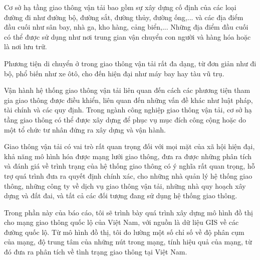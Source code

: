 \documentclass[14pt, oneside, a4paper, openany]{scrartcl}
\begin{document}
Cơ sở hạ tầng giao thông vận tải bao gồm sự xây dựng cố định của các loại đường đi như đường bộ, đường sắt, đường thủy, đường ống,... và các địa điểm đầu cuối như sân bay, nhà ga, kho hàng, cảng biển,... Những địa điểm đầu cuối có thể được sử dụng như nơi trung gian vận chuyển con người và hàng hóa hoặc là nơi lưu trữ.

Phương tiện di chuyển ở trong giao thông vận tải rất đa dạng, từ đơn giản như đi bộ, phổ biến như xe ôtô, cho đến hiện đại như máy bay hay tàu vũ trụ.

Vận hành hệ thống giao thông vận tải liên quan đến cách các phương tiện tham gia giao thông được điều khiển, liên quan đến những vấn đề khác như luật pháp, tài chính và các quy định. Trong ngành công nghiệp giao thông vận tải, cơ sở hạ tầng giao thông có thể được xây dựng để phục vụ mục đích công cộng hoặc do một tổ chức tư nhân đứng ra xây dựng và vận hành.

Giao thông vận tải có vai trò rất quan trọng đối với mọi mặt của xã hội hiện đại, khả năng mô hình hóa được mạng lưới giao thông, đưa ra được những phân tích và đánh giá về trình trạng của hệ thống giao thông có ý nghĩa rất quan trọng, hỗ trợ quá trình đưa ra quyết định chính xác, cho những nhà quản lý hệ thống giao thông, những công ty về dịch vụ giao thông vận tải, những nhà quy hoạch xây dựng và đất đai, và tất cả các đối tượng đang sử dụng hệ thống giao thông.

Trong phần này của báo cáo, tôi sẽ trình bày quá trình xây dựng mô hình đồ thị cho mạng giao thông quốc lộ của Việt Nam, với nguồn là dữ liệu GIS về các đường quốc lộ. Từ mô hình đồ thị, tôi đo lường một số chỉ số về độ phân cụm của mạng, độ trung tâm của những nút trong mạng, tính hiệu quả của mạng, từ đó đưa ra phân tích về tình trạng giao thông tại Việt Nam.

%
%
\end{document}
